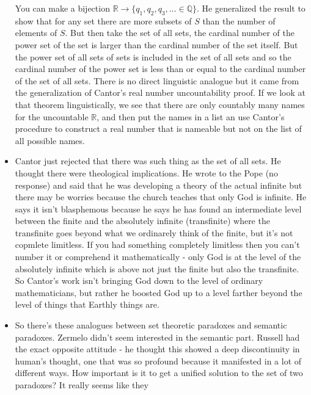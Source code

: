 \documentclass[12pt]{article}
\theoremstyle{definition}
\begin{document}
\begin{itemize}
        You can make a bijection $\mathbb{R} \rightarrow \{q_1, q_2, q_3,
        \ldots \in \mathbb{Q}\}$. He generalized the result to show that for
        any set there are more subsets of $S$ than the number of elements of
        $S$. But then take the set of all sets, the cardinal number of the
        power set of the set is larger than the cardinal number of the set
        itself. But the power set of all sets of sets is included in the set of
        all sets and so the cardinal number of the power set is less than or
        equal to the cardinal number of the set of all sets. There is no direct
        linguistic analogue but it came from the generalization of Cantor's
        real number uncountability proof. If we look at that theorem
        linguistically, we see that there are only countably many names for the
        uncountable $\mathbb{R}$, and then put the names in a list an use
        Cantor's procedure to construct a real number that is nameable but not
        on the list of all possible names.
    \item
        Cantor just rejected that there was such thing as the set of all sets.
        He thought there were theological implications. He wrote to the Pope
        (no response) and said that he was developing a theory of the actual
        infinite but there may be worries because the church teaches that only
        God is infinite. He says it isn't blasphemous because he says he has
        found an intermediate level between the finite and the absolutely
        infinite (transfinite) where the transfinite goes beyond what we
        ordinarely think of the finite, but it's not copmlete limitless. If you
        had something completely limitless then you can't number it or
        comprehend it mathematically - only God is at the level of the
        absolutely infinite which is above not just the finite but also the
        transfinite. So Cantor's work isn't bringing God down to the level of
        ordinary mathematicians, but rather he boosted God up to a level
        farther beyond the level of things that Earthly things are. 
    \item
        So there's these analogues between set theoretic paradoxes and semantic
        paradoxes. Zermelo didn't seem interested in the semantic part. Russell
        had the exact opposite attitude - he thought this showed a deep
        discontinuity in human's thought, one that was so profound because it
        manifested in a lot of different ways. How important is it to get a
        unified solution to the set of two paradoxes? It really seems like they

\end{itemize}
\end{document}
